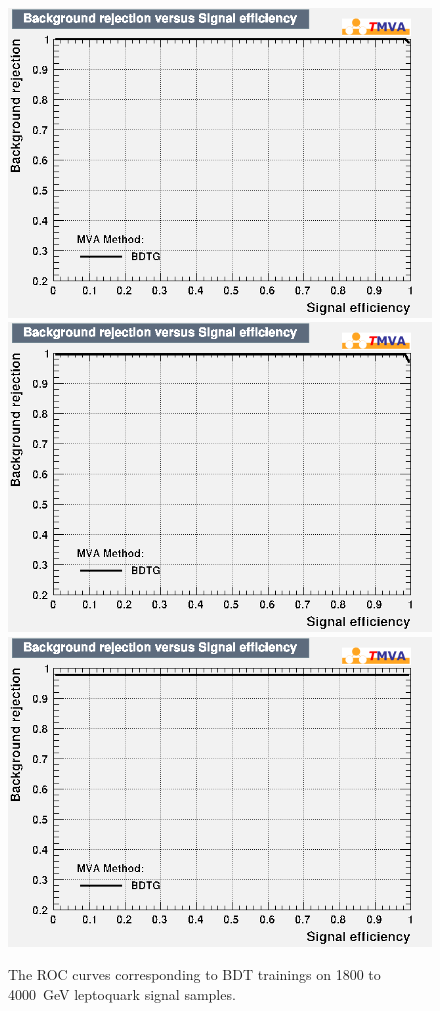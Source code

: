 \begin{figure}[H]
    {\includegraphics[width=.32\textwidth]{Images/Analysis/Results_LQToBMu_pair_uubj_BDTG_FullRun2_2023_01_25_020318/3000/rejBvsS.png}}
    {\includegraphics[width=.32\textwidth]{Images/Analysis/Results_LQToBMu_pair_uubj_BDTG_FullRun2_2023_01_25_020318/3500/rejBvsS.png}}
    {\includegraphics[width=.32\textwidth]{Images/Analysis/Results_LQToBMu_pair_uubj_BDTG_FullRun2_2023_01_25_020318/4000/rejBvsS.png}}
    \caption{The ROC curves corresponding to BDT trainings on 1800 to \SI{4000}{GeV} leptoquark signal samples.}
    \label{figapp:roc2}
\end{figure}

\clearpage